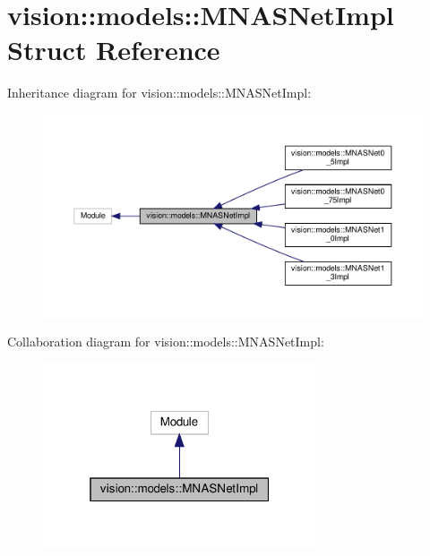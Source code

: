 \hypertarget{structvision_1_1models_1_1MNASNetImpl}{}\section{vision\+:\+:models\+:\+:M\+N\+A\+S\+Net\+Impl Struct Reference}
\label{structvision_1_1models_1_1MNASNetImpl}


Inheritance diagram for vision\+:\+:models\+:\+:M\+N\+A\+S\+Net\+Impl\+:
\nopagebreak
\begin{figure}[H]
\begin{center}
\leavevmode
\includegraphics[width=350pt]{structvision_1_1models_1_1MNASNetImpl__inherit__graph}
\end{center}
\end{figure}


Collaboration diagram for vision\+:\+:models\+:\+:M\+N\+A\+S\+Net\+Impl\+:
\nopagebreak
\begin{figure}[H]
\begin{center}
\leavevmode
\includegraphics[width=229pt]{structvision_1_1models_1_1MNASNetImpl__coll__graph}
\end{center}
\end{figure}
